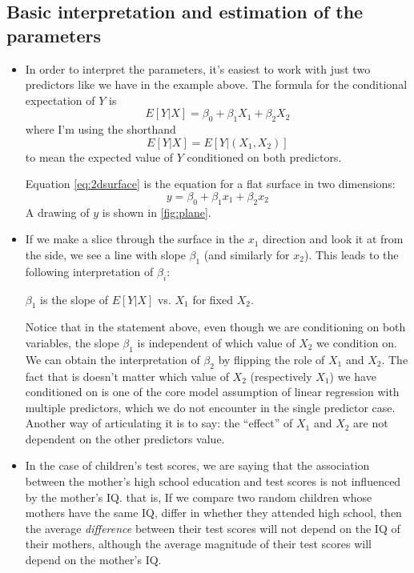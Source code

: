 \subsection{Basic interpretation and estimation of the parameters }
\begin{itemize}
\item In order to interpret the parameters, it's easiest to work with just two predictors like we have in the example above. The formula for the conditional expectation of $Y$ is 
\begin{equation}\label{eq:2dsurface}
E[Y|X] = \beta_0 + \beta_1X_1 + \beta_2X_2
\end{equation}
where I'm using the shorthand 
\begin{equation*}
E[Y|X] = E[Y|(X_1,X_2)]
\end{equation*}
to mean the expected value of $Y$ conditioned on both predictors. 



Equation \ref{eq:2dsurface} is the equation for a flat surface in two dimensions: 
\begin{equation}
y = \beta_0 + \beta_1x_1 + \beta_2x_2
\end{equation}
A drawing of $y$ is shown in \ref{fig:plane}. 


 \item If we make a slice through the surface in the $x_1$ direction and look it at from the side, we see a line with slope $\beta_1$ (and similarly for $x_2$).  This leads to the following interpretation of $\beta_i$:  
 \begin{center}
 $\beta_1$ is the slope of $E[Y|X]$ vs. $X_1$ for fixed $X_2$. 
 \end{center}
Notice that in the statement above, even though we are conditioning on both variables, the slope $\beta_1$ is independent of which value of $X_2$ we condition on. We can obtain the interpretation of $\beta_2$ by flipping the role of $X_1$ and $X_2$. 
The fact that is doesn't matter which value of $X_2$ (respectively $X_1$) we have conditioned on is one of the core model assumption of linear regression with multiple predictors, which we do not encounter in the single predictor case. Another way of articulating it is to say: the ``effect'' of $X_1$ and $X_2$ are not dependent on the other predictors value.
\item In the case of children's test scores, we are saying that the association between the mother's high school education and test scores is not influenced by the mother's IQ. that is, If we compare two random children whose mothers have the same IQ, differ in whether they attended high school, then the average \emph{difference} between their test scores will not depend on the IQ of their mothers, although the average magnitude of their test scores will depend on the mother's IQ. 




\end{itemize}
